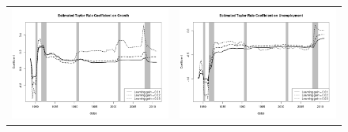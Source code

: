 \documentclass[12pt]{article}
\begin{document}
\begin{figure}
\begin{tabular}{cc}
\includegraphics[scale=0.4]{coef_growth_ols.png} & \includegraphics[scale=0.4]{coef_unemployment_ols.png} \\
\end{tabular}
\end{figure}
\end{document}
